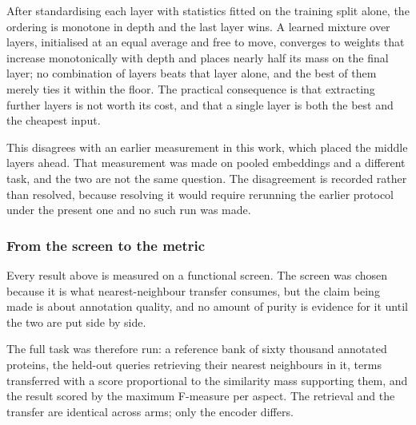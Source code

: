 After standardising each layer with statistics fitted on the training split alone,
the ordering is monotone in depth and the last layer wins. A learned mixture over
layers, initialised at an equal average and free to move, converges to weights that
increase monotonically with depth and places nearly half its mass on the final layer;
no combination of layers beats that layer alone, and the best of them merely ties it
within the floor. The practical consequence is that extracting further layers is not
worth its cost, and that a single layer is both the best and the cheapest input.

This disagrees with an earlier measurement in this work, which placed the middle
layers ahead. That measurement was made on pooled embeddings and a different task,
and the two are not the same question. The disagreement is recorded rather than
resolved, because resolving it would require rerunning the earlier protocol under the
present one and no such run was made.

\subsubsection{From the screen to the metric}
\label{sec:exp15-fmax}

Every result above is measured on a functional screen. The screen was chosen because
it is what nearest-neighbour transfer consumes, but the claim being made is about
annotation quality, and no amount of purity is evidence for it until the two are put
side by side.

The full task was therefore run: a reference bank of sixty thousand annotated
proteins, the held-out queries retrieving their nearest neighbours in it, terms
transferred with a score proportional to the similarity mass supporting them, and the
result scored by the maximum F-measure per aspect. The retrieval and the transfer are
identical across arms; only the encoder differs.

\begin{table}[htbp]
  \centering
  \caption{Maximum F-measure on the full retrieval and transfer task, against the
  deployed encoder, scored against propagated reference closures over the whole
  evaluation set. Intervals are 2{,}000 bootstrap draws paired on proteins.
  \textbf{These figures do not survive the stratification of
  Section~\ref{sec:exp15-category}} and are kept because the size of the difference
  between the two protocols is itself the result.}
  \label{tab:exp15-fmax}
  
\end{table}

